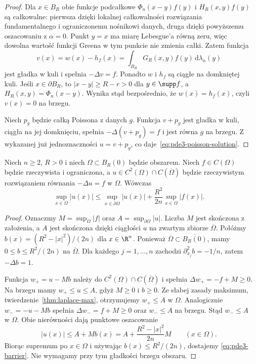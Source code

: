 \begin{proof}
Dla $x\in B_R$ obie funkcje podcałkowe
$\Phi_n(x-y)f(y)$ i $H_R(x,y)f(y)$ są całkowalne:
pierwsza dzięki lokalnej całkowalności rozwiązania
fundamentalnego i ograniczonemu nośnikowi danych,
druga dzięki powyższemu oszacowaniu z $\alpha=0$.
Punkt $y=x$ ma miarę Lebesgue'a równą zeru, więc
dowolna wartość funkcji Greena w tym punkcie nie
zmienia całki. Zatem funkcja
\[
 v(x)=w(x)-h_f(x)=
 \int_{B_R}G_R(x,y)f(y)\,\mathrm d\lambda_n(y)
\]
jest gładka w kuli i spełnia $-\Delta v=f$.
Ponadto $w$ i $h_f$ są ciągłe na domkniętej kuli.
Jeśli $x\in\partial B_R$, to $|x-y|\geq R-r>0$
dla $y\in\supp f$, a $H_R(x,y)=\Phi_n(x-y)$.
Wynika stąd bezpośrednio, że $w(x)=h_f(x)$,
czyli $v(x)=0$ na brzegu.

Niech $p_g$ będzie całką Poissona z danych $g$.
Funkcja $v+p_g$ jest gładka w kuli, ciągła na jej
domknięciu, spełnia $-\Delta(v+p_g)=f$ i jest równa
$g$ na brzegu. Z wykazanej już jednoznaczności
$u=v+p_g$, co daje~\eqref{eq:pde3-poisson-solution}.
\end{proof}

\begin{stwierdzenie}
\label{prop:pde3-barrier}
Niech $n\geq2$, $R>0$ i niech $\Omega\subset B_R(0)$
będzie obszarem. Niech $f\in C(\Omega)$ będzie rzeczywista
i ograniczona, a $u\in C^2(\Omega)\cap C(\overline\Omega)$
będzie rzeczywistym rozwiązaniem równania $-\Delta u=f$
w $\Omega$. Wówczas
\begin{equation}\label{eq:pde3-barrier}
 \sup_{x\in\Omega}|u(x)|\leq
 \sup_{x\in\partial\Omega}|u(x)|+
 \frac{R^2}{2n}\sup_{x\in\Omega}|f(x)|.
\end{equation}
\end{stwierdzenie}
\begin{proof}
Oznaczmy $M=\sup_\Omega|f|$ oraz $A=\sup_{\partial\Omega}|u|$.
Liczba $M$ jest skończona z założenia, a $A$ jest
skończona dzięki ciągłości $u$ na zwartym zbiorze
$\overline\Omega$. Połóżmy $b(x)=(R^2-|x|^2)/(2n)$
dla $x\in\R^n$. Ponieważ
$\overline\Omega\subset\overline{B_R(0)}$,
mamy $0\leq b\leq R^2/(2n)$ na $\overline\Omega$.
Dla każdego $j=1,\ldots,n$ zachodzi
$\partial_{x_j}^2b=-1/n$, zatem $-\Delta b=1$.

Funkcja $w_+=u-Mb$ należy do
$C^2(\Omega)\cap C(\overline\Omega)$ i spełnia
$\Delta w_+=-f+M\geq0$. Na brzegu mamy
$w_+\leq u\leq A$, gdyż $M\geq0$ i $b\geq0$.
Ze słabej zasady maksimum, twierdzenie~\ref{thm:laplace-max},
otrzymujemy $w_+\leq A$ w $\Omega$.
Analogicznie $w_-=-u-Mb$ spełnia
$\Delta w_-=f+M\geq0$ oraz $w_-\leq A$ na brzegu.
Stąd $w_-\leq A$ w $\Omega$.
Obie nierówności dają punktowe oszacowanie
\[
 |u(x)|\leq A+Mb(x)
 =A+\frac{R^2-|x|^2}{2n}M
 \qquad(x\in\Omega).
\]
Biorąc supremum po $x\in\Omega$ i używając
$b(x)\leq R^2/(2n)$, dostajemy
\eqref{eq:pde3-barrier}. Nie wymagamy przy tym
gładkości brzegu obszaru.
\end{proof}

